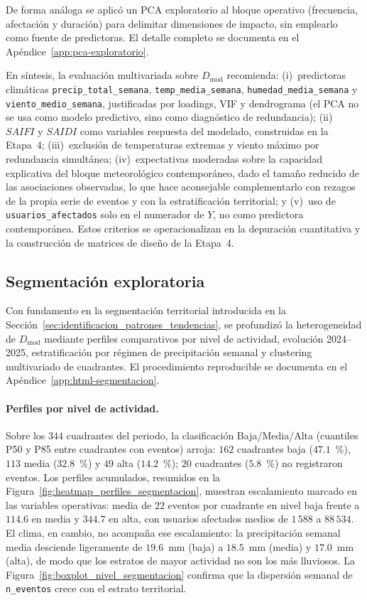     
    De forma análoga se aplicó un PCA exploratorio al bloque operativo (frecuencia, afectación y duración) para delimitar dimensiones de impacto, sin emplearlo como fuente de predictoras. El detalle completo se documenta en el Apéndice~\ref{app:pca-exploratorio}.
    
    \noindent En síntesis, la evaluación multivariada sobre $D_{\mathrm{mod}}$ recomienda: (i)~predictoras climáticas \texttt{precip\_total\_semana}, \texttt{temp\_media\_semana}, \texttt{humedad\_media\_semana} y \texttt{viento\_medio\_semana}, justificadas por loadings, VIF y dendrograma (el PCA no se usa como modelo predictivo, sino como diagnóstico de redundancia); (ii)~$SAIFI$ y $SAIDI$ como variables respuesta del modelado, construidas en la Etapa~4; (iii)~exclusión de temperaturas extremas y viento máximo por redundancia simultánea; (iv)~expectativas moderadas sobre la capacidad explicativa del bloque meteorológico contemporáneo, dado el tamaño reducido de las asociaciones observadas, lo que hace aconsejable complementarlo con rezagos de la propia serie de eventos y con la estratificación territorial; y (v)~uso de \texttt{usuarios\_afectados} solo en el numerador de $Y$, no como predictora contemporánea. Estos criterios se operacionalizan en la depuración cuantitativa y la construcción de matrices de diseño de la Etapa~4.
    
\subsection{Segmentación exploratoria}
\label{sec:segmentacion_exploratoria}
    Con fundamento en la segmentación territorial introducida en la Sección~\ref{sec:identificacion_patrones_tendencias}, se profundizó la heterogeneidad de $D_{\mathrm{mod}}$ mediante perfiles comparativos por nivel de actividad, evolución 2024--2025, estratificación por régimen de precipitación semanal y clustering multivariado de cuadrantes. El procedimiento reproducible se documenta en el Apéndice~\ref{app:html-segmentacion}.
    
    \paragraph{Perfiles por nivel de actividad.} Sobre los $344$ cuadrantes del periodo, la clasificación Baja/Media/Alta (cuantiles P50 y P85 entre cuadrantes con eventos) arroja: $162$ cuadrantes baja ($47{.}1$~\%), $113$ media ($32{.}8$~\%) y $49$ alta ($14{.}2$~\%); $20$ cuadrantes ($5{.}8$~\%) no registraron eventos. Los perfiles acumulados, resumidos en la Figura~\ref{fig:heatmap_perfiles_segmentacion}, muestran escalamiento marcado en las variables operativas: media de $22$ eventos por cuadrante en nivel baja frente a $114{.}6$ en media y $344{.}7$ en alta, con usuarios afectados medios de $1\,588$ a $88\,534$. El clima, en cambio, no acompaña ese escalamiento: la precipitación semanal media desciende ligeramente de $19{.}6$~mm (baja) a $18{.}5$~mm (media) y $17{.}0$~mm (alta), de modo que los estratos de mayor actividad no son los más lluviosos. La Figura~\ref{fig:boxplot_nivel_segmentacion} confirma que la dispersión semanal de \texttt{n\_eventos} crece con el estrato territorial.
    
